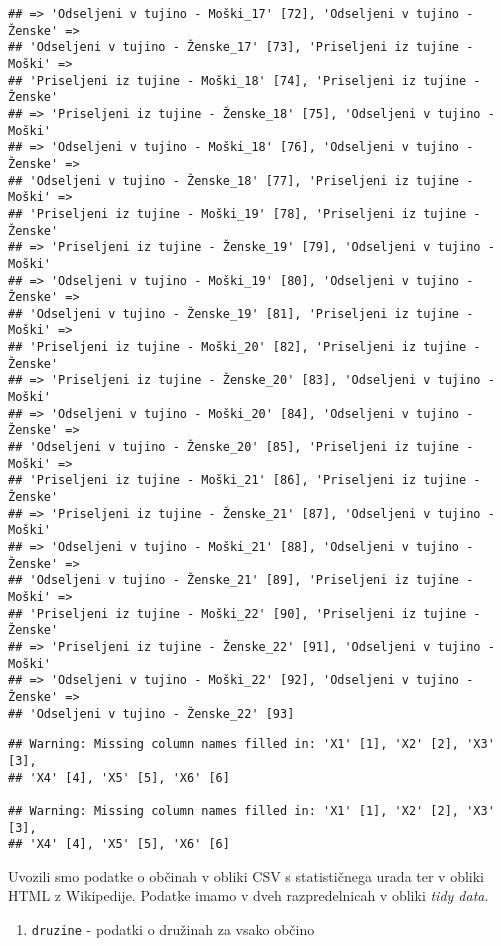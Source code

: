 \documentclass[]{article}
\providecommand{\tightlist}{%
  \setlength{\itemsep}{0pt}\setlength{\parskip}{0pt}}
\begin{document}
\begin{verbatim}
## => 'Odseljeni v tujino - Moški_17' [72], 'Odseljeni v tujino - Ženske' =>
## 'Odseljeni v tujino - Ženske_17' [73], 'Priseljeni iz tujine - Moški' =>
## 'Priseljeni iz tujine - Moški_18' [74], 'Priseljeni iz tujine - Ženske'
## => 'Priseljeni iz tujine - Ženske_18' [75], 'Odseljeni v tujino - Moški'
## => 'Odseljeni v tujino - Moški_18' [76], 'Odseljeni v tujino - Ženske' =>
## 'Odseljeni v tujino - Ženske_18' [77], 'Priseljeni iz tujine - Moški' =>
## 'Priseljeni iz tujine - Moški_19' [78], 'Priseljeni iz tujine - Ženske'
## => 'Priseljeni iz tujine - Ženske_19' [79], 'Odseljeni v tujino - Moški'
## => 'Odseljeni v tujino - Moški_19' [80], 'Odseljeni v tujino - Ženske' =>
## 'Odseljeni v tujino - Ženske_19' [81], 'Priseljeni iz tujine - Moški' =>
## 'Priseljeni iz tujine - Moški_20' [82], 'Priseljeni iz tujine - Ženske'
## => 'Priseljeni iz tujine - Ženske_20' [83], 'Odseljeni v tujino - Moški'
## => 'Odseljeni v tujino - Moški_20' [84], 'Odseljeni v tujino - Ženske' =>
## 'Odseljeni v tujino - Ženske_20' [85], 'Priseljeni iz tujine - Moški' =>
## 'Priseljeni iz tujine - Moški_21' [86], 'Priseljeni iz tujine - Ženske'
## => 'Priseljeni iz tujine - Ženske_21' [87], 'Odseljeni v tujino - Moški'
## => 'Odseljeni v tujino - Moški_21' [88], 'Odseljeni v tujino - Ženske' =>
## 'Odseljeni v tujino - Ženske_21' [89], 'Priseljeni iz tujine - Moški' =>
## 'Priseljeni iz tujine - Moški_22' [90], 'Priseljeni iz tujine - Ženske'
## => 'Priseljeni iz tujine - Ženske_22' [91], 'Odseljeni v tujino - Moški'
## => 'Odseljeni v tujino - Moški_22' [92], 'Odseljeni v tujino - Ženske' =>
## 'Odseljeni v tujino - Ženske_22' [93]
\end{verbatim}

\begin{verbatim}
## Warning: Missing column names filled in: 'X1' [1], 'X2' [2], 'X3' [3],
## 'X4' [4], 'X5' [5], 'X6' [6]

## Warning: Missing column names filled in: 'X1' [1], 'X2' [2], 'X3' [3],
## 'X4' [4], 'X5' [5], 'X6' [6]
\end{verbatim}

Uvozili smo podatke o občinah v obliki CSV s statističnega urada ter v
obliki HTML z Wikipedije. Podatke imamo v dveh razpredelnicah v obliki
\emph{tidy data}.

\begin{enumerate}
\def\labelenumi{\arabic{enumi}.}
\tightlist
\item
  \texttt{druzine} - podatki o družinah za vsako občino
\end{enumerate}
\end{document}
